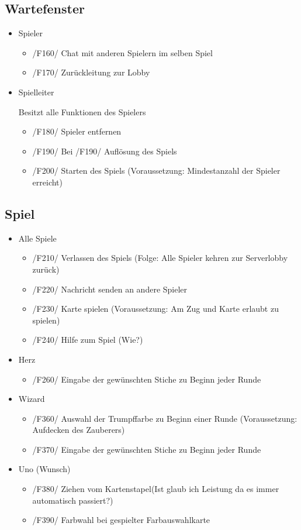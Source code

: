 \documentclass{article}
\begin{document}
\subsection{Wartefenster}
\begin{itemize}
	\item Spieler
	\begin{itemize}
		\item /F160/ Chat mit anderen Spielern im selben Spiel
		\item /F170/ Zurückleitung zur Lobby
	\end{itemize}
	\item Spielleiter
	
	Besitzt alle Funktionen des Spielers
	\begin{itemize}
		\item /F180/ Spieler entfernen
		\item /F190/ Bei /F190/ Auflösung des Spiels
		\item /F200/ Starten des Spiels (Voraussetzung: Mindestanzahl der Spieler erreicht)
	\end{itemize}
\end{itemize}

\subsection{Spiel}
\begin{itemize}
	\item Alle Spiele
	\begin{itemize}
		\item /F210/ Verlassen des Spiels (Folge: Alle Spieler kehren zur Serverlobby zurück)
		\item /F220/ Nachricht senden an andere Spieler
		\item /F230/ Karte spielen (Voraussetzung: Am Zug und Karte erlaubt zu spielen)
		\item /F240/ Hilfe zum Spiel (Wie?)
	\end{itemize}
	\item Herz
	\begin{itemize}
		\item /F260/ Eingabe der gewünschten Stiche zu Beginn jeder Runde
	\end{itemize}
	\item Wizard
	\begin{itemize}
		\item /F360/ Auswahl der Trumpffarbe zu Beginn einer Runde (Voraussetzung: Aufdecken des Zauberers)
		\item /F370/ Eingabe der gewünschten Stiche zu Beginn jeder Runde
	\end{itemize}
	\item Uno (Wunsch)
	\begin{itemize}
		\item /F380/ Ziehen vom Kartenstapel(Ist glaub ich Leistung da es immer automatisch passiert?)
		\item /F390/ Farbwahl bei gespielter Farbauswahlkarte
	\end{itemize}
\end{itemize}
\end{document}
